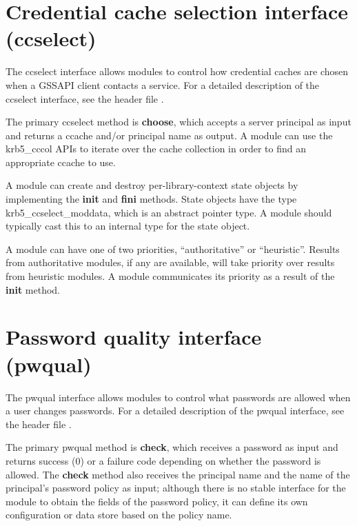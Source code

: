 \documentclass[letterpaper,10pt,english]{sphinxmanual}
\begin{document}
\section{Credential cache selection interface (ccselect)}
\label{plugindev/ccselect:credential-cache-selection-interface-ccselect}\label{plugindev/ccselect::doc}\label{plugindev/ccselect:ccselect-plugin}
The ccselect interface allows modules to control how credential caches
are chosen when a GSSAPI client contacts a service.  For a detailed
description of the ccselect interface, see the header file
.

The primary ccselect method is \textbf{choose}, which accepts a server
principal as input and returns a ccache and/or principal name as
output.  A module can use the krb5\_cccol APIs to iterate over the
cache collection in order to find an appropriate ccache to use.

A module can create and destroy per-library-context state objects by
implementing the \textbf{init} and \textbf{fini} methods.  State objects have
the type krb5\_ccselect\_moddata, which is an abstract pointer type.  A
module should typically cast this to an internal type for the state
object.

A module can have one of two priorities, ``authoritative'' or
``heuristic''.  Results from authoritative modules, if any are
available, will take priority over results from heuristic modules.  A
module communicates its priority as a result of the \textbf{init} method.


\section{Password quality interface (pwqual)}
\label{plugindev/pwqual::doc}\label{plugindev/pwqual:password-quality-interface-pwqual}\label{plugindev/pwqual:pwqual-plugin}
The pwqual interface allows modules to control what passwords are
allowed when a user changes passwords.  For a detailed description of
the pwqual interface, see the header file .

The primary pwqual method is \textbf{check}, which receives a password as
input and returns success (0) or a  failure code
depending on whether the password is allowed.  The \textbf{check} method
also receives the principal name and the name of the principal's
password policy as input; although there is no stable interface for
the module to obtain the fields of the password policy, it can define
its own configuration or data store based on the policy name.
\end{document}
